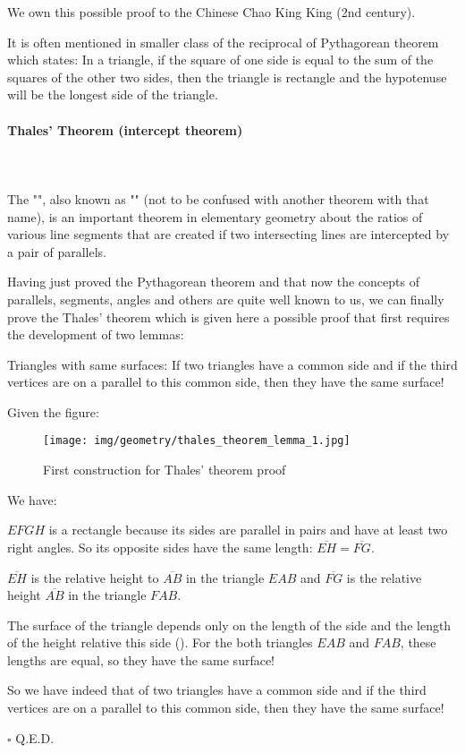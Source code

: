 	\begin{tcolorbox}[title=Remark,colframe=black,arc=10pt]
	We own this possible proof to the Chinese Chao King King (2nd century).
	\end{tcolorbox}
	It is often mentioned in smaller class of the reciprocal of Pythagorean theorem which states: In a triangle, if the square of one side is equal to the sum of the squares of the other two sides, then the triangle is rectangle and the hypotenuse will be the longest side of the triangle.
	
	\paragraph{Thales' Theorem (intercept theorem)}\mbox{}\\\\
	The "", also known as "" (not to be confused with another theorem with that name), is an important theorem in elementary geometry about the ratios of various line segments that are created if two intersecting lines are intercepted by a pair of parallels.
	
	Having just proved the Pythagorean theorem and that now the concepts of parallels, segments, angles and others are quite well known to us, we can finally prove the Thales' theorem which is given here a possible proof that first requires the development of two lemmas:
	\begin{lemma}
	 Triangles with same surfaces: If two triangles have a common side and if the third vertices are on a parallel to this common side, then they have the same surface!
	\end{lemma}
	\begin{dem}
	Given the figure:
	\begin{figure}[H]
		\centering
		\texttt{[image: img/geometry/thales\_theorem\_lemma\_1.jpg]}
		\caption[]{First construction for Thales' theorem proof}
	\end{figure}
	We have:
	
	$EFGH$ is a rectangle because its sides are parallel in pairs and have at least two right angles. So its opposite sides have the same length: $\overline{EH} = \overline{FG}$.
	
	$\overline{EH}$ is the relative height to $\overline{AB}$ in the triangle $EAB$ and $\overline{FG}$ is the relative height $\overline{AB}$ in the triangle $FAB$.
	
	The surface of the triangle depends only on the length of the side and the length of the height relative this side (). For the both triangles $EAB$ and $FAB$, these lengths are equal, so they have the same surface!
	
	So we have indeed that of two triangles have a common side and if the third vertices are on a parallel to this common side, then they have the same surface!
	\begin{flushright}
		$\square$  Q.E.D.
	\end{flushright}
	\end{dem}
	
